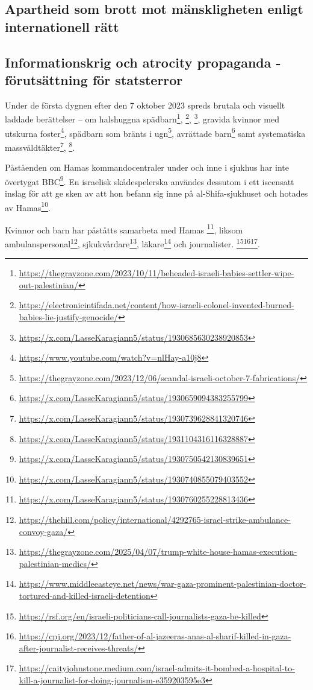 

\subsection{Apartheid som brott mot mänskligheten enligt internationell rätt}



\subsection{Informationskrig och atrocity propaganda -förutsättning för statsterror}


Under de första dygnen efter den 7 oktober 2023 spreds brutala och visuellt laddade berättelser – om halshuggna spädbarn\footnote{\url{https://thegrayzone.com/2023/10/11/beheaded-israeli-babies-settler-wipe-out-palestinian/}}, 
\footnote{\url{https://electronicintifada.net/content/how-israeli-colonel-invented-burned-babies-lie-justify-genocide/}}, 
\footnote{\url{https://x.com/LasseKaragiann5/status/1930685630238920853}}, 
gravida kvinnor med utskurna foster\footnote{\url{https://www.youtube.com/watch?v=nlHay-a10j8}}, 
spädbarn som bränts i ugn\footnote{\url{https://thegrayzone.com/2023/12/06/scandal-israeli-october-7-fabrications/}}, 
avrättade barn\footnote{\url{https://x.com/LasseKaragiann5/status/1930659094383255799}} samt 
systematiska massvåldtäkter\footnote{\url{https://x.com/LasseKaragiann5/status/1930739628841320746}}, 
\footnote{\url{https://x.com/LasseKaragiann5/status/1931104316116328887}}.



Påståenden om Hamas kommandocentraler under och inne i sjukhus har inte övertygat BBC\footnote{\url{https://x.com/LasseKaragiann5/status/1930750542130839651}}. En israelisk skådespelerska användes dessutom i ett iscensatt inslag för att ge sken av att hon befann sig inne på al-Shifa-sjukhuset och hotades av Hamas\footnote{\url{https://x.com/LasseKaragiann5/status/1930740855079403552}}.

Kvinnor och barn har påståtts samarbeta med Hamas \footnote{\url{https://x.com/LasseKaragiann5/status/1930760255228813436}}, liksom ambulanspersonal\footnote{\url{https://thehill.com/policy/international/4292765-israel-strike-ambulance-convoy-gaza/}}, sjkukvårdare\footnote{\url{https://thegrayzone.com/2025/04/07/trump-white-house-hamas-execution-palestinian-medics/}}, läkare\footnote{\url{https://www.middleeasteye.net/news/war-gaza-prominent-palestinian-doctor-tortured-and-killed-israeli-detention}} och journalister.
\footnote{\url{https://rsf.org/en/israeli-politicians-call-journalists-gaza-be-killed}}\footnote{\url{https://cpj.org/2023/12/father-of-al-jazeeras-anas-al-sharif-killed-in-gaza-after-journalist-receives-threats/}}\footnote{\url{https://caityjohnstone.medium.com/israel-admits-it-bombed-a-hospital-to-kill-a-journalist-for-doing-journalism-e359203595e3}}. 





